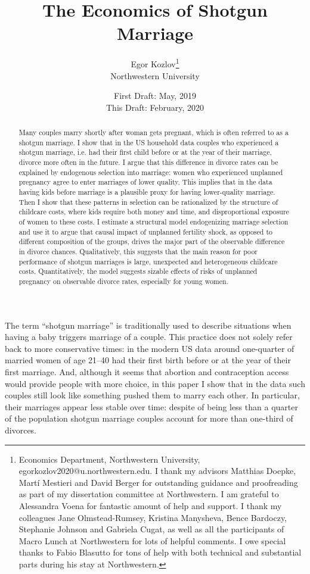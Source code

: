 \documentclass[12pt,letter]{article}
\title{The Economics of Shotgun Marriage}
\author{Egor Kozlov\thanks{Economics Department, Northwestern University, egorkozlov2020@u.northwestern.edu. I thank my advisors Matthias Doepke, Martí Mestieri and David Berger for outstanding guidance and proofreading as part of my dissertation committee at Northwestern. I am grateful to Alessandra Voena for fantastic amount of help and support. I thank my colleagues Jane Olmstead-Rumsey, Kristina Manysheva, Bence Bardoczy, Stephanie Johnson and Gabriela Cugat, as well as all the participants of Macro Lunch at Northwestern for lots of helpful comments. I owe special thanks to Fabio Blasutto for tons of help with both technical and substantial parts during his stay at Northwestern.}\\
{\small Northwestern University}}
\date{First Draft: May, 2019 \\[1em] This Draft: February, 2020}
\begin{document}

\maketitle

\begin{abstract}
Many couples marry shortly after woman gets pregnant, which is often referred to as a shotgun marriage. I show that in the US household data couples who experienced a shotgun marriage, i.e. had their first child before or at the year of their marriage, divorce more often in the future. I argue that this difference in divorce rates can be explained by endogenous selection into marriage: women who experienced unplanned pregnancy agree to enter marriages of lower quality. This implies that in the data having kids before marriage is a plausible proxy for having lower-quality marriage. Then I show that these patterns in selection can be rationalized by the structure of childcare costs, where kids require both money and time, and disproportional exposure of women to these costs. I estimate a structural model endogenizing marriage selection and use it to argue that causal impact of unplanned fertility shock, as opposed to different composition of the groups, drives the major part of the observable difference in divorce chances. Qualitatively, this suggests that the main reason for poor performance of shotgun marriages is large, unexpected and heterogeneous childcare costs. Quantitatively, the model suggests sizable effects of risks of unplanned pregnancy on observable divorce rates, especially for young women.
\end{abstract}

\newpage

The term ``shotgun marriage'' is traditionally used to describe situations when having a baby triggers marriage of a couple. This practice does not solely refer back to more conservative times: in the modern US data around one-quarter of married women of age 21--40 had their first birth before or at the year of their first marriage. And, although it seems that abortion and contraception access would provide people with more choice, in this paper I show that in the data such couples still look like something pushed them to marry each other. In particular, their marriages appear less stable over time: despite of being less than a quarter of the population shotgun marriage couples account for more than one-third of divorces.
\end{document}
